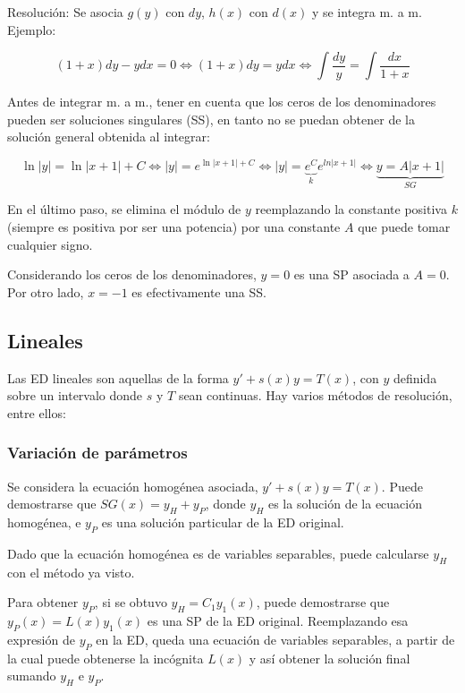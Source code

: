 \documentclass{article}
\begin{document}
Resolución: Se asocia $g(y)$ con $dy$, $h(x)$ con $d(x)$ y se integra m. a m. Ejemplo:

\begin{equation}
(1+x) dy - y dx = 0 \Leftrightarrow (1+x) dy = y dx \Leftrightarrow \int \frac{dy}{y} = \int \frac{dx}{1+x}
\end{equation}

Antes de integrar m. a m., tener en cuenta que los ceros de los denominadores pueden ser soluciones singulares (SS), en tanto no se puedan obtener de la solución general obtenida al integrar:

\begin{equation}
\ln |y| = \ln |x + 1| + C \Leftrightarrow |y| = e^{\ln |x+1| + C } \Leftrightarrow |y| = \underbrace{e^C}_{k} e^{ln |x+1|} \Leftrightarrow \underbrace{y = A |x+1|}_{SG}
\end{equation}

En el último paso, se elimina el módulo de $y$ reemplazando la constante positiva $k$ (siempre es positiva por ser una potencia) por una constante $A$ que puede tomar cualquier signo.

Considerando los ceros de los denominadores, $y = 0$ es una SP asociada a $A = 0$. Por otro lado, $x = -1$ es efectivamente una SS.

\subsection{Lineales}

Las ED lineales son aquellas de la forma $y' + s(x) y = T(x)$, con $y$ definida sobre un intervalo donde $s$ y $T$ sean continuas. Hay varios métodos de resolución, entre ellos:

\subsubsection{Variación de parámetros}

Se considera la ecuación homogénea asociada, $y' + s(x) y = T(x)$. Puede demostrarse que $SG(x) = y_H + y_P$, donde $y_H$ es la solución de la ecuación homogénea, e $y_P$ es una solución particular de la ED original.

Dado que la ecuación homogénea es de variables separables, puede calcularse $y_H$ con el método ya visto.

Para obtener $y_P$, si se obtuvo $y_H = C_1 y_1(x)$, puede demostrarse que $y_P(x) = L(x) y_1(x)$ es una SP de la ED original. Reemplazando esa expresión de $y_P$ en la ED, queda una ecuación de variables separables, a partir de la cual puede obtenerse la incógnita $L(x)$ y así obtener la solución final sumando $y_H$ e $y_P$.
\end{document}
